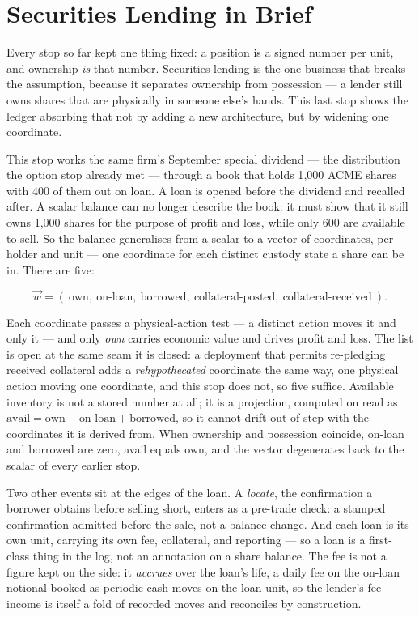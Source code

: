 \section{Securities Lending in Brief}\label{sec:tour-sbl}

Every stop so far kept one thing fixed: a position is a signed number per unit, and
ownership \emph{is} that number. Securities lending is the one business that breaks the
assumption, because it separates ownership from possession --- a lender still owns
shares that are physically in someone else's hands. This last stop shows the ledger
absorbing that not by adding a new architecture, but by widening one coordinate.

This stop works the same firm's September special dividend --- the  distribution
the option stop already met --- through a book that holds 1{,}000 ACME shares with 400
of them out on loan. A loan is opened before the dividend and recalled after. A scalar
balance can no longer describe the book: it must show that it still owns 1{,}000 shares
for the purpose of profit and loss, while only 600 are available to sell. So the balance
generalises from a scalar to a vector of coordinates, per holder and unit --- one
coordinate for each distinct custody state a share can be in. There are five:

\[
  \vec{w} = (\ \text{own},\ \text{on-loan},\ \text{borrowed},\ \text{collateral-posted},\
  \text{collateral-received}\ ).
\]

Each coordinate passes a physical-action test --- a distinct action moves it and only it
--- and only \emph{own} carries economic value and drives profit and loss. The list is
open at the same seam it is closed: a deployment that permits re-pledging received
collateral adds a \emph{rehypothecated} coordinate the same way, one physical action
moving one coordinate, and this stop does not, so five suffice. Available inventory is
not a stored number at all; it is a projection, computed on read as
$\text{avail} = \text{own} - \text{on-loan} + \text{borrowed}$, so it cannot drift out
of step with the coordinates it is derived from. When ownership and possession
coincide, on-loan and borrowed are zero, avail equals own, and the vector degenerates
back to the scalar of every earlier stop.

Two other events sit at the edges of the loan. A \emph{locate}, the confirmation a
borrower obtains before selling short, enters as a pre-trade check: a stamped
confirmation admitted before the sale, not a balance change. And each loan is its own
unit, carrying its own fee, collateral, and reporting --- so a loan is a first-class
thing in the log, not an annotation on a share balance. The fee is not a figure kept on
the side: it \emph{accrues} over the loan's life, a daily fee on the on-loan
notional booked as periodic cash moves on the loan unit, so the lender's fee income is
itself a fold of recorded moves and reconciles by construction.

